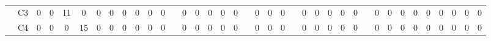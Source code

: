 \documentclass[12pt]{article}
\begin{document}
\begin{table}[!ht]
{\begin{tabular}{cccccccccccccccccccccccccccccccccccccc}
\multicolumn{1}{c|}{}                       & \multicolumn{1}{c|}{C3}  & \multicolumn{1}{c|}{0}  & \multicolumn{1}{c|}{0}  & \multicolumn{1}{c|}{11} & \multicolumn{1}{c|}{0}  & \multicolumn{1}{c|}{0}  & \multicolumn{1}{c|}{0}  & \multicolumn{1}{c|}{0}  & \multicolumn{1}{c|}{0}  & \multicolumn{1}{c|}{0}  & \multicolumn{1}{c|}{0}  & \multicolumn{1}{c|}{}                     & \multicolumn{1}{c|}{0}  & \multicolumn{1}{c|}{0}  & \multicolumn{1}{c|}{0}  & \multicolumn{1}{c|}{0}  & \multicolumn{1}{c|}{0}  & \multicolumn{1}{c|}{}                     & \multicolumn{1}{c|}{0}  & \multicolumn{1}{c|}{0}  & \multicolumn{1}{c|}{0}  & \multicolumn{1}{c|}{}                     & \multicolumn{1}{c|}{0}  & \multicolumn{1}{c|}{0}  & \multicolumn{1}{c|}{0}  & \multicolumn{1}{c|}{0}  & \multicolumn{1}{c|}{0}  & \multicolumn{1}{c|}{}                     & \multicolumn{1}{c|}{0}  & \multicolumn{1}{c|}{0}  & \multicolumn{1}{c|}{0}  & \multicolumn{1}{c|}{0}  & \multicolumn{1}{c|}{0}  & \multicolumn{1}{c|}{0}  & \multicolumn{1}{c|}{0}  & \multicolumn{1}{c|}{0}  & \multicolumn{1}{c|}{0}  \\ \cline{2-12} \cline{14-18} \cline{20-22} \cline{24-28} \cline{30-38} 
\multicolumn{1}{c|}{}                       & \multicolumn{1}{c|}{C4}  & \multicolumn{1}{c|}{0}  & \multicolumn{1}{c|}{0}  & \multicolumn{1}{c|}{0}  & \multicolumn{1}{c|}{15} & \multicolumn{1}{c|}{0}  & \multicolumn{1}{c|}{0}  & \multicolumn{1}{c|}{0}  & \multicolumn{1}{c|}{0}  & \multicolumn{1}{c|}{0}  & \multicolumn{1}{c|}{0}  & \multicolumn{1}{c|}{}                     & \multicolumn{1}{c|}{0}  & \multicolumn{1}{c|}{0}  & \multicolumn{1}{c|}{0}  & \multicolumn{1}{c|}{0}  & \multicolumn{1}{c|}{0}  & \multicolumn{1}{c|}{}                     & \multicolumn{1}{c|}{0}  & \multicolumn{1}{c|}{0}  & \multicolumn{1}{c|}{0}  & \multicolumn{1}{c|}{}                     & \multicolumn{1}{c|}{0}  & \multicolumn{1}{c|}{0}  & \multicolumn{1}{c|}{0}  & \multicolumn{1}{c|}{0}  & \multicolumn{1}{c|}{0}  & \multicolumn{1}{c|}{}                     & \multicolumn{1}{c|}{0}  & \multicolumn{1}{c|}{0}  & \multicolumn{1}{c|}{0}  & \multicolumn{1}{c|}{0}  & \multicolumn{1}{c|}{0}  & \multicolumn{1}{c|}{0}  & \multicolumn{1}{c|}{0}  & \multicolumn{1}{c|}{0}  & \multicolumn{1}{c|}{0}  \\ \cline{2-12} \cline{14-18} \cline{20-22} \cline{24-28} \cline{30-38} 

\end{tabular}}
\end{table}
\end{document}
